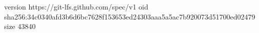 version https://git-lfs.github.com/spec/v1
oid sha256:34c0340afd3b6d6bc7628f153653ed24303aaa5a5ac7b920073d51700ed02479
size 43840
